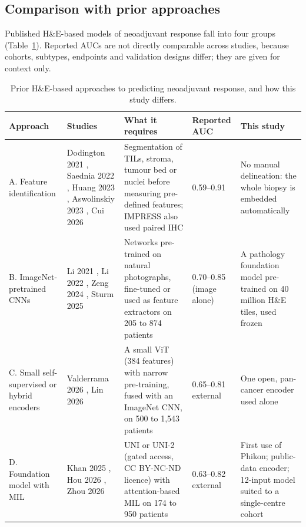 \documentclass[10pt,a4paper,twocolumn]{article}
\begin{document}
\subsection{Comparison with prior approaches}
Published H\&E-based models of neoadjuvant response fall into four groups (Table~\ref{tab:prior}). Reported AUCs are not directly comparable across studies, because cohorts, subtypes, endpoints and validation designs differ; they are given for context only.

\begin{table}[t]
\centering
\caption{Prior H\&E-based approaches to predicting neoadjuvant response, and how this study differs.}
\label{tab:prior}
\footnotesize
\begin{tabularx}{\textwidth}{@{}p{2.2cm}p{3.3cm}X p{1.8cm} X@{}}
\toprule
Approach & Studies & What it requires & Reported AUC & This study \\
\midrule
A. Feature identification & Dodington 2021 \cite{dodington2021}, Saednia 2022 \cite{saednia2022}, Huang 2023 \cite{huang2023}, Aswolinskiy 2023 \cite{aswolinskiy2023}, Cui 2026 \cite{cui2026} & Segmentation of TILs, stroma, tumour bed or nuclei before measuring pre-defined features; IMPRESS also used paired IHC & 0.59--0.91 & No manual delineation: the whole biopsy is embedded automatically \\
\addlinespace
B. ImageNet-pretrained CNNs & Li 2021 \cite{li2021}, Li 2022 \cite{li2022}, Zeng 2024 \cite{zeng2024}, Sturm 2025 \cite{sturm2025} & Networks pre-trained on natural photographs, fine-tuned or used as feature extractors on 205 to 874 patients & 0.70--0.85 (image alone) & A pathology foundation model pre-trained on 40 million H\&E tiles, used frozen \\
\addlinespace
C. Small self-supervised or hybrid encoders & Valderrama 2026 \cite{valderrama2026}, Lin 2026 \cite{lin2026} & A small ViT (384 features) with narrow pre-training, fused with an ImageNet CNN, on 500 to 1,543 patients & 0.65--0.81 external & One open, pan-cancer encoder used alone \\
\addlinespace
D. Foundation model with MIL & Khan 2025 \cite{khan2025}, Hou 2026 \cite{hou2026}, Zhou 2026 \cite{zhou2026} & UNI or UNI-2 (gated access, CC BY-NC-ND licence) with attention-based MIL on 174 to 950 patients & 0.63--0.82 external & First use of Phikon; public-data encoder; 12-input model suited to a single-centre cohort \\
\bottomrule
\end{tabularx}
\end{table}
\end{document}
